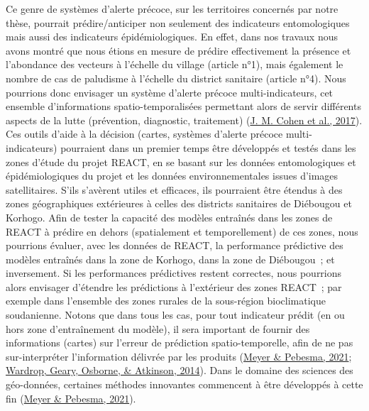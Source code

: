\documentclass[12pt,twoside]{reedthesis}
\begin{document}
Ce genre de systèmes d'alerte précoce, sur les territoires concernés par notre thèse, pourrait prédire/anticiper non seulement des indicateurs entomologiques mais aussi des indicateurs épidémiologiques. En effet, dans nos travaux nous avons montré que nous étions en mesure de prédire effectivement la présence et l'abondance des vecteurs à l'échelle du village (article n°1), mais également le nombre de cas de paludisme à l'échelle du district sanitaire (article n°4). Nous pourrions donc envisager un système d'alerte précoce multi-indicateurs, cet ensemble d'informations spatio-temporalisées permettant alors de servir différents aspects de la lutte (prévention, diagnostic, traitement) (\protect\hyperlink{ref-cohen_mapping_2017}{J. M. Cohen et al., 2017}).\\

Ces outils d'aide à la décision (cartes, systèmes d'alerte précoce multi-indicateurs) pourraient dans un premier temps être développés et testés dans les zones d'étude du projet REACT, en se basant sur les données entomologiques et épidémiologiques du projet et les données environnementales issues d'images satellitaires. S'ils s'avèrent utiles et efficaces, ils pourraient être étendus à des zones géographiques extérieures à celles des districts sanitaires de Diébougou et Korhogo. Afin de tester la capacité des modèles entraînés dans les zones de REACT à prédire en dehors (spatialement et temporellement) de ces zones, nous pourrions évaluer, avec les données de REACT, la performance prédictive des modèles entraînés dans la zone de Korhogo, dans la zone de Diébougou~; et inversement. Si les performances prédictives restent correctes, nous pourrions alors envisager d'étendre les prédictions à l'extérieur des zones REACT~; par exemple dans l'ensemble des zones rurales de la sous-région bioclimatique soudanienne. Notons que dans tous les cas, pour tout indicateur prédit (en ou hors zone d'entraînement du modèle), il sera important de fournir des informations (cartes) sur l'erreur de prédiction spatio-temporelle, afin de ne pas sur-interpréter l'information délivrée par les produits (\protect\hyperlink{ref-meyer_predicting_2021}{Meyer \& Pebesma, 2021}; \protect\hyperlink{ref-wardrop_interpreting_2014}{Wardrop, Geary, Osborne, \& Atkinson, 2014}). Dans le domaine des sciences des géo-données, certaines méthodes innovantes commencent à être développés à cette fin (\protect\hyperlink{ref-meyer_predicting_2021}{Meyer \& Pebesma, 2021}).\\
\end{document}
